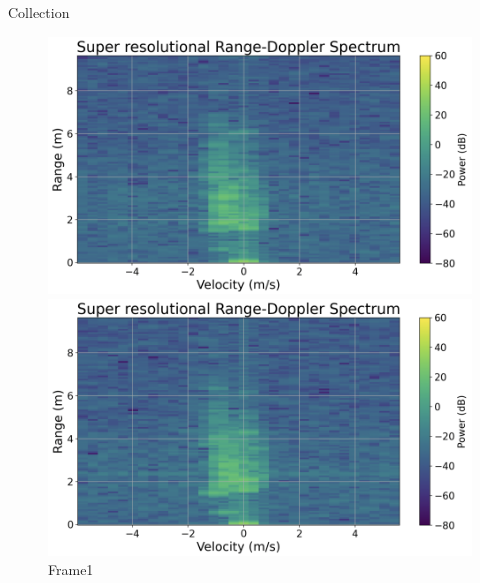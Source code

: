 \documentclass{beamer}
\begin{document}
\begin{frame}[t]{Collection}

    \begin{figure}
        \centering
        \hspace*{-1cm}
        \begin{minipage}{0.25\textwidth}
            \centering
            \includegraphics[height=0.75\textwidth, keepaspectratio]{MA_presentation/figures/frame1.png}
            \caption*{\hspace{0.25cm}Frame1}
        \end{minipage}
        \begin{minipage}{0.25\textwidth}
            \centering
            \includegraphics[height=0.75\textwidth]{MA_presentation/figures/frame2.png}

\end{minipage}
\end{figure}
\end{frame}
\end{document}
